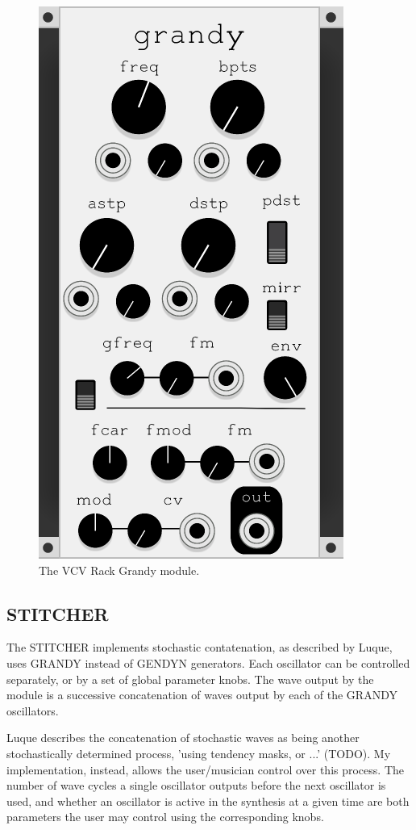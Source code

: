 \documentclass[10pt]{article}
\begin{document}
\begin{figure}
  \caption{The VCV Rack Grandy module.}
  \centering
    \includegraphics[height=0.25\textheight]{grandy}
\end{figure}

\subsection{STITCHER}
The STITCHER implements stochastic contatenation, as described by Luque, uses GRANDY instead of GENDYN generators. Each oscillator can be controlled separately, or by a set of global parameter knobs. The wave output by the module is a successive concatenation of waves output by each of the GRANDY oscillators.

Luque describes the concatenation of stochastic waves as being another stochastically determined process, 'using tendency masks, or ...' (TODO).\citep{sergio2006} My implementation, instead, allows the user/musician control over this process. The number of wave cycles a single oscillator outputs before the next oscillator is used, and whether an oscillator is active in the synthesis at a given time are both parameters the user may control using the corresponding knobs.
\end{document}
